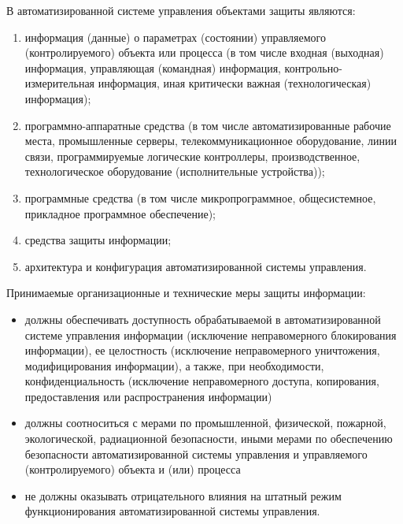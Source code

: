 В автоматизированной системе управления объектами защиты являются:
\begin{enumerate}
	\item информация (данные) о параметрах (состоянии) управляемого (контролируемого) объекта или процесса (в том числе входная (выходная) информация, управляющая (командная) информация, контрольно-измерительная информация, иная критически важная (технологическая) информация);
	\item программно-аппаратные средства (в том числе автоматизированные рабочие места, промышленные серверы, телекоммуникационное оборудование, линии связи, программируемые логические контроллеры, производственное, технологическое оборудование (исполнительные устройства));
	\item программные средства (в том числе микропрограммное, общесистемное, прикладное программное обеспечение);
	\item средства защиты информации;
	\item архитектура и конфигурация автоматизированной системы управления.
\end{enumerate}
\begin{grayquote}
	Принимаемые организационные и технические меры защиты информации:
	\begin{itemize}
		\item должны обеспечивать доступность обрабатываемой в автоматизированной системе управления информации (исключение неправомерного блокирования информации), ее целостность (исключение неправомерного уничтожения, модифицирования информации), а также, при необходимости, конфиденциальность (исключение неправомерного доступа, копирования, предоставления или распространения информации)
		\item должны соотноситься с мерами по промышленной, физической, пожарной, экологической, радиационной безопасности, иными мерами по обеспечению безопасности автоматизированной системы управления и управляемого (контролируемого) объекта и (или) процесса
		\item не должны оказывать отрицательного влияния на штатный режим функционирования автоматизированной системы управления.
	\end{itemize}
\end{grayquote}


